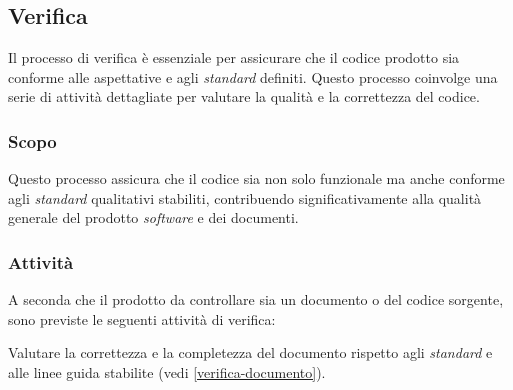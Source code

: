 \subsection{Verifica}

Il processo di verifica è essenziale per assicurare che il codice prodotto sia
conforme alle aspettative e agli \textit{standard} definiti. Questo processo coinvolge
una serie di attività dettagliate per valutare la qualità e la correttezza del
codice.

\subsubsection{Scopo}
Questo processo assicura che il codice sia non solo funzionale ma anche
conforme agli \textit{standard} qualitativi stabiliti, contribuendo significativamente
alla qualità generale del prodotto \textit{software} e dei documenti.

\subsubsection{Attività}
A seconda che il prodotto da controllare sia un documento o del codice sorgente,
sono previste le seguenti attività di verifica:

Valutare la correttezza e la
	  completezza del documento rispetto agli \textit{standard} e alle linee guida
	  stabilite (vedi \cref{verifica-documento}).


